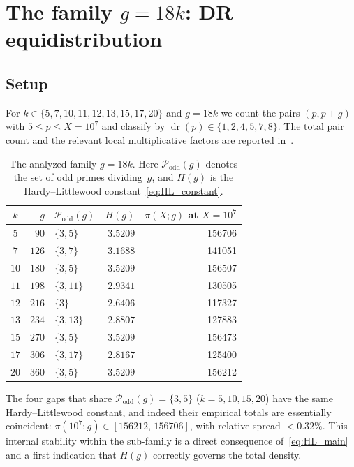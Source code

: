 \documentclass[11pt]{amsart}
\theoremstyle{plain}
\theoremstyle{definition}
\theoremstyle{remark}
\DeclareMathOperator{\dr}{dr}
\begin{document}
\section{The family $g=18k$: DR equidistribution}\label{sec:gap18k}

\subsection{Setup}

For $k \in \{5,7,10,11,12,13,15,17,20\}$ and $g = 18k$ we count the
pairs $(p,p+g)$ with $5 \le p \le X = 10^7$ and classify by
$\dr(p) \in \{1,2,4,5,7,8\}$. The total pair count and the relevant
local multiplicative factors are reported in~.

\begin{table}[h]
\centering
\caption{The analyzed family $g=18k$. Here
$\mathcal{P}_{\mathrm{odd}}(g)$ denotes the set of odd primes
dividing~$g$, and $H(g)$ is the Hardy--Littlewood
constant~\eqref{eq:HL_constant}.}
\label{tab:gap18k_setup}
\begin{tabular}{@{}c r l r r@{}}
\toprule
$k$ & $g$ & $\mathcal{P}_{\mathrm{odd}}(g)$ & $H(g)$ &
$\pi(X;g)$ at $X=10^7$ \\
\midrule
$5$  & $90$  & $\{3,5\}$    & $3.5209$ & \num{156706} \\
$7$  & $126$ & $\{3,7\}$    & $3.1688$ & \num{141051} \\
$10$ & $180$ & $\{3,5\}$    & $3.5209$ & \num{156507} \\
$11$ & $198$ & $\{3,11\}$   & $2.9341$ & \num{130505} \\
$12$ & $216$ & $\{3\}$      & $2.6406$ & \num{117327} \\
$13$ & $234$ & $\{3,13\}$   & $2.8807$ & \num{127883} \\
$15$ & $270$ & $\{3,5\}$    & $3.5209$ & \num{156473} \\
$17$ & $306$ & $\{3,17\}$   & $2.8167$ & \num{125400} \\
$20$ & $360$ & $\{3,5\}$    & $3.5209$ & \num{156212} \\
\bottomrule
\end{tabular}
\end{table}

The four gaps that share $\mathcal{P}_{\mathrm{odd}}(g)=\{3,5\}$
($k = 5,10,15,20$) have the same Hardy--Littlewood constant, and indeed
their empirical totals are essentially coincident:
$\pi(10^7;g) \in [\num{156212},\,\num{156706}]$, with relative spread
$< 0.32\%$. This internal stability within the sub-family is a direct
consequence of~\eqref{eq:HL_main} and a first indication that $H(g)$
correctly governs the total density.
\end{document}
